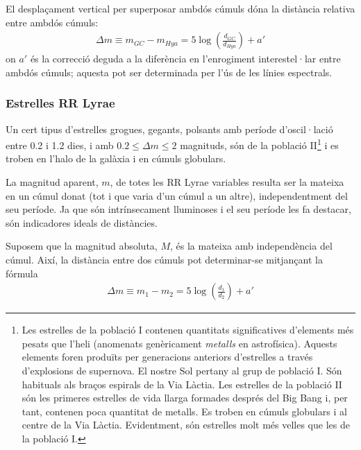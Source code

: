 El desplaçament vertical per superposar ambdós cúmuls dóna la distància relativa entre ambdós cúmuls:
\begin{align}
	\Delta m \equiv m_{GC} - m_{Hya} = 5 \log(\frac{d_{GC}}{d_{Hya}}) + a'
\end{align}
on $a'$ és la correcció deguda a la diferència en l'enrogiment interestel·lar entre ambdós cúmuls; aquesta pot ser determinada per l'ús de les línies espectrals.

\subsubsection*{Estrelles RR Lyrae}
Un cert tipus d'estrelles grogues, gegants, polsants amb període d'oscil·lació entre 0.2 i 1.2 dies, i amb $0.2 \leq \Delta m \leq 2$ magnituds, són de la població II\footnote{Les estrelles de la població I contenen quantitats significatives d'elements més pesats que l'heli (anomenats genèricament \textit{metalls} en astrofísica). Aquests elements foren produïts per generacions anteriors d'estrelles a través d'explosions de supernova. El nostre Sol pertany al grup de població I. Són habituals als braços espirals de la Via Làctia. Les estrelles de la població II són les primeres estrelles de vida llarga formades després del Big Bang i, per tant, contenen poca quantitat de metalls. Es troben en cúmuls globulars i al centre de la Via Làctia. Evidentment, són estrelles molt més velles que les de la població I.} i es troben en l'halo de la galàxia i en cúmuls globulars.

La magnitud aparent, $m$, de totes les RR Lyrae variables resulta ser la mateixa en un cúmul donat (tot i que varia d'un cúmul a un altre), independentment del seu període. Ja que són intrínsecament lluminoses i el seu període les fa destacar, són indicadores ideals de distàncies.

Suposem que la magnitud absoluta, $M$, és la mateixa amb independència del cúmul. Així, la distància entre dos cúmuls pot determinar-se mitjançant la fórmula
\begin{align}
	\Delta m \equiv m_{1} - m_{2} = 5 \log(\frac{d_{1}}{d_{2}}) + a'
\end{align}

